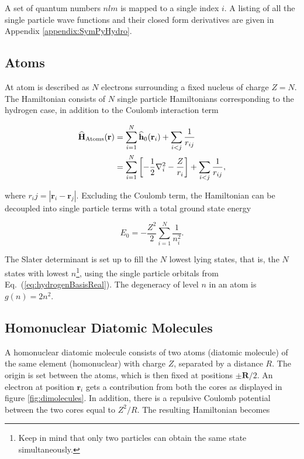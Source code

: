 A set of quantum numbers $nlm$ is mapped to a single index $i$. A listing of all the single particle wave functions and their closed form derivatives are given in Appendix \ref{appendix:SymPyHydro}.

\subsection{Atoms}

At atom is described as $N$ electrons surrounding a fixed nucleus of charge $Z=N$. The Hamiltonian consists of $N$ single particle Hamiltonians corresponding to the hydrogen case, in addition to the Coulomb interaction term

\begin{align}
 {\bf\widehat{H}}_{\mathrm{Atoms}}(\mathbf{r}) &= \sum_{i=1}^N {\bf\widehat{h}}_0(\mathbf{r}_i) + \sum_{i<j} \frac{1}{r_{ij}} \\
                         &= \sum_{i=1}^N \left[-\frac{1}{2}\nabla_i^2 - \frac{Z}{r_i}\right] + \sum_{i<j} \frac{1}{r_{ij}},
\end{align}

where $r_ij = |\mathbf{r}_i -\mathbf{r}_j|$. Excluding the Coulomb term, the Hamiltonian can be decoupled into single particle terms with a total ground state energy

\begin{equation}
 E_0 = -\frac{Z^2}{2}\sum_{i=1}^N \frac{1}{n_i^2}.
\end{equation}

The Slater determinant is set up to fill the $N$ lowest lying states, that is, the $N$ states with lowest $n$\footnote{Keep in mind that only two particles can obtain the same state simultaneously.}, using the single particle orbitals from Eq.~(\ref{eq:hydrogenBasisReal}). The degeneracy of level $n$ in an atom is $g(n) = 2n^2$.

\subsection{Homonuclear Diatomic Molecules}

A homonuclear diatomic molecule consists of two atoms (diatomic molecule) of the same element (homonuclear) with charge $Z$, separated by a distance $R$. The origin is set between the atoms, which is then fixed at positions $\pm \mathbf{R}/2$. An electron at position $\mathbf{r}_i$ gets a contribution from both the cores as displayed in figure \ref{fig:dimolecules}. In addition, there is a repulsive Coulomb potential between the two cores equal to $Z^2/R$. The resulting Hamiltonian becomes

